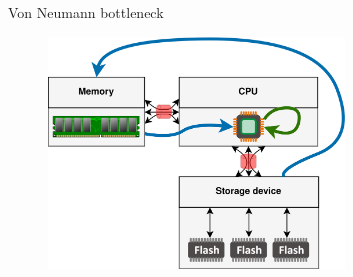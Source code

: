 \documentclass{beamer}
\begin{document}
\begin{frame}{Von Neumann bottleneck}
	\begingroup
	\small
	\begin{figure}
		\centering
		\includegraphics[width=0.7\textwidth]{resources/images/bottleneck.png}
	\end{figure}
	\endgroup
\end{frame}
\end{document}
